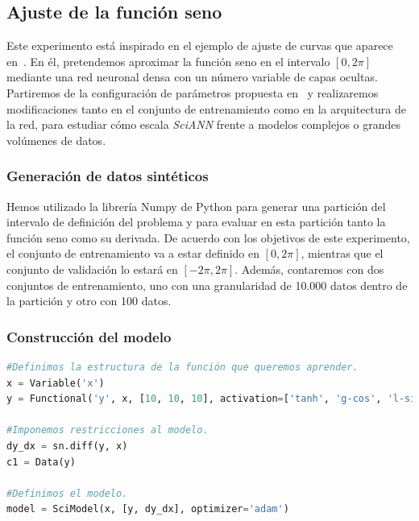 \subsection{Ajuste de la función seno}
Este experimento está inspirado en el ejemplo de ajuste de curvas que aparece en~\cite{Haghighat2021}. En él, pretendemos aproximar la función seno en el intervalo $[0,2\pi]$ mediante una red neuronal densa con un número variable de capas ocultas. Partiremos de la configuración de parámetros propuesta en~\cite{Haghighat2021} y realizaremos modificaciones tanto en el conjunto de entrenamiento como en la arquitectura de la red, para estudiar cómo escala \textit{SciANN} frente a modelos complejos o grandes volúmenes de datos. 

\subsubsection{Generación de datos sintéticos}
Hemos utilizado la librería Numpy de Python para generar una partición del intervalo de definición del problema y para evaluar en esta partición tanto la función seno como su derivada. De acuerdo con los objetivos de este experimento, el conjunto de entrenamiento va a estar definido en $[0,2\pi]$, mientras que el conjunto de validación lo estará en $[-2\pi,2\pi]$. Además, contaremos con dos conjuntos de entrenamiento, uno con una granularidad de 10.000 datos dentro de la partición y otro con 100 datos. 

\subsubsection{Construcción del modelo}

\begin{lstlisting}[language=Python,caption={Modelo en \textit{SciANN} para el ajuste de la función seno.},label={lst:exp1-sin}]
#Definimos la estructura de la función que queremos aprender.
x = Variable('x')
y = Functional('y', x, [10, 10, 10], activation=['tanh', 'g-cos', 'l-sin'])

#Imponemos restricciones al modelo. 
dy_dx = sn.diff(y, x)
c1 = Data(y)

#Definimos el modelo.
model = SciModel(x, [y, dy_dx], optimizer='adam')
\end{lstlisting}

